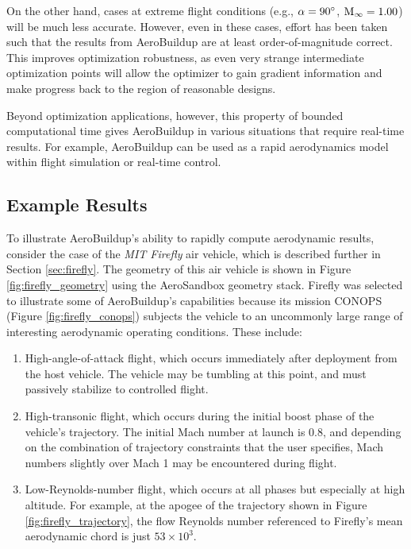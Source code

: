 On the other hand, cases at extreme flight conditions (e.g., $\alpha=90\degree$, $\rm M_\infty=1.00$) will be much less accurate. However, even in these cases, effort has been taken such that the results from AeroBuildup are at least order-of-magnitude correct. This improves optimization robustness, as even very strange intermediate optimization points will allow the optimizer to gain gradient information and make progress back to the region of reasonable designs.

Beyond optimization applications, however, this property of bounded computational time gives AeroBuildup in various situations that require real-time results. For example, AeroBuildup can be used as a rapid aerodynamics model within flight simulation or real-time control.

\subsection{Example Results}

To illustrate AeroBuildup's ability to rapidly compute aerodynamic results, consider the case of the \emph{MIT Firefly} air vehicle, which is described further in Section \ref{sec:firefly}. The geometry of this air vehicle is shown in Figure \ref{fig:firefly_geometry} using the AeroSandbox geometry stack. Firefly was selected to illustrate some of AeroBuildup's capabilities because its mission CONOPS (Figure \ref{fig:firefly_conops}) subjects the vehicle to an uncommonly large range of interesting aerodynamic operating conditions. These include:

\begin{enumerate}
    \item High-angle-of-attack flight, which occurs immediately after deployment from the host vehicle. The vehicle may be tumbling at this point, and must passively stabilize to controlled flight.

    \item High-transonic flight, which occurs during the initial boost phase of the vehicle's trajectory. The initial Mach number at launch is $0.8$, and depending on the combination of trajectory constraints that the user specifies, Mach numbers slightly over Mach 1 may be encountered during flight.

    \item Low-Reynolds-number flight, which occurs at all phases but especially at high altitude. For example, at the apogee of the trajectory shown in Figure \ref{fig:firefly_trajectory}, the flow Reynolds number referenced to Firefly's mean aerodynamic chord is just $53 \times 10^3$.

\end{enumerate}

